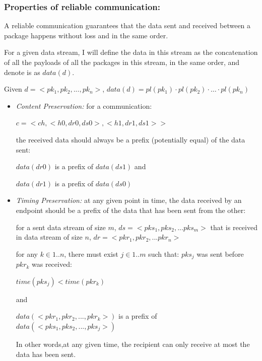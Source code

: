 \subsubsection{Properties of reliable communication:}
A reliable communication guarantees that the data sent and received between a package happens without loss and in the same order.

For a given data stream, I will define the data in this stream as the concatenation of all the payloads of all the packages in this stream, in the same order, and denote is as $data(d)$.

Given $ d = <pk_1, pk_2, ..., pk_n>$, $data(d) = pl(pk_1) \cdot pl(pk_2)\cdot \ldots \cdot pl(pk_n)$


\begin{itemize}
 \item \textit{ Content Preservation:} for a communication:

$c = <ch, <h0, dr0, ds0>, <h1, dr1, ds1>>$

the received data should always be a prefix (potentially equal) of the data sent:

$data(dr0)$ is a prefix of $data(ds1)$  and

$data(dr1)$ is a prefix of $data(ds0)$

 \item \textit{Timing Preservation:} at any given point in time, the data received by an endpoint should be a prefix of the data that has been sent from the other:
 
for a sent data stream of size $m$, $ds= <pks_1, pks_2, ... pks_m>$ that is received in data stream of size $n$, $dr = <pkr_1, pkr_2, ... pkr_n>$

for any $k \in {1..n}$, there must exist $j \in {1..m}$ such that: $pks_j$ was sent before $pkr_k$ was received:

$  time(pks_j) < time(pkr_k)$

  and

$  data(<pkr_1, pkr_2, ..., pkr_k>)$ is a prefix of $data(<pks_1, pks_2, ..., pks_j>)$

  In other words,at any given time, the recipient can only receive at most the data has been sent.

\end{itemize}

